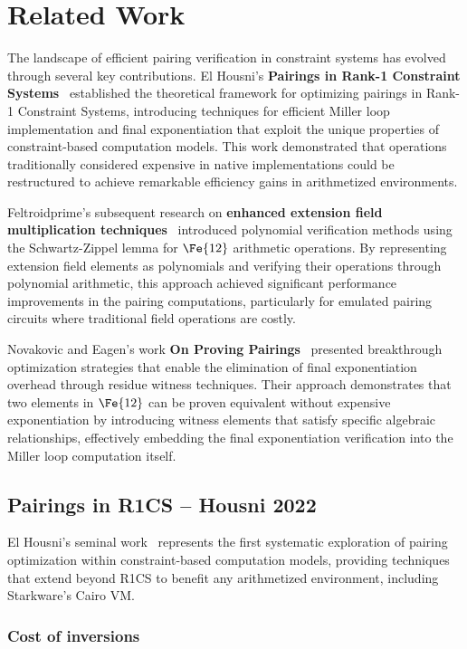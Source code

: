 \section{Related Work}

The landscape of efficient pairing verification in constraint systems has evolved through several key contributions. El Housni's \textbf{Pairings in Rank-1 Constraint Systems}~\cite{PR1CS22} established the theoretical framework for optimizing pairings in Rank-1 Constraint Systems, introducing techniques for efficient Miller loop implementation and final exponentiation that exploit the unique properties of constraint-based computation models. This work demonstrated that operations traditionally considered expensive in native implementations could be restructured to achieve remarkable efficiency gains in arithmetized environments.

Feltroidprime's subsequent research on \textbf{enhanced extension field multiplication techniques}~\cite{FXFM23} introduced polynomial verification methods using the Schwartz-Zippel lemma for $\Fe{12}$ arithmetic operations. By representing extension field elements as polynomials and verifying their operations through polynomial arithmetic, this approach achieved significant performance improvements in the pairing computations, particularly for emulated pairing circuits where traditional field operations are costly.

Novakovic and Eagen's work \textbf{On Proving Pairings}~\cite{OPP24} presented breakthrough optimization strategies that enable the elimination of final exponentiation overhead through residue witness techniques. Their approach demonstrates that two elements in $\Fe{12}$ can be proven equivalent without expensive exponentiation by introducing witness elements that satisfy specific algebraic relationships, effectively embedding the final exponentiation verification into the Miller loop computation itself.

\subsection{Pairings in R1CS -- Housni 2022}

El Housni's seminal work~\cite{PR1CS22} represents the first systematic exploration of pairing optimization within constraint-based computation models, providing techniques that extend beyond R1CS to benefit any arithmetized environment, including Starkware's Cairo VM\cite{cairo}.

\subsubsection{Cost of inversions}

